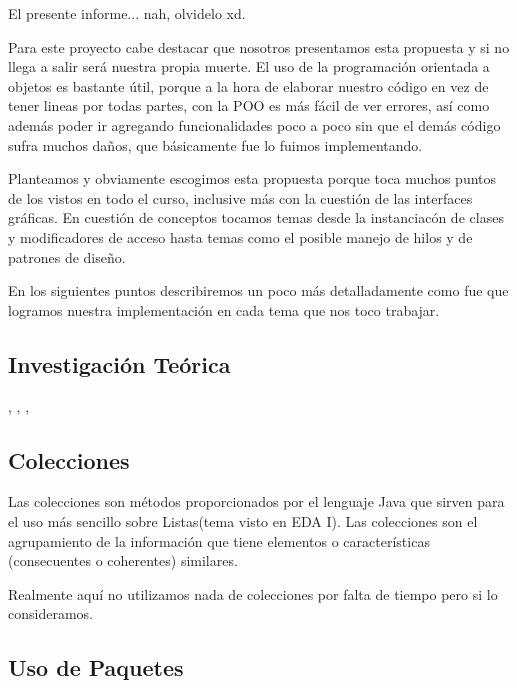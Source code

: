 \documentclass{article}
\begin{document}
El presente informe... nah, olvidelo xd.\newline

Para este proyecto cabe destacar que nosotros presentamos esta propuesta y si no llega a salir será nuestra propia muerte. El uso de la programación orientada a objetos es bastante útil, porque a la hora de elaborar nuestro código en vez de tener lineas por todas partes, con la POO es más fácil de ver errores, así como además poder ir agregando funcionalidades poco a poco sin que el demás código sufra muchos daños, que básicamente fue lo fuimos implementando.\newline

Planteamos y obviamente escogimos esta propuesta porque toca muchos puntos de los vistos en todo el curso, inclusive más con la cuestión de las interfaces gráficas. En cuestión de conceptos tocamos temas desde la instanciacón de clases y modificadores de acceso hasta temas como el posible manejo de hilos y de patrones de diseño.\newline

En los siguientes puntos describiremos un poco más detalladamente como fue que logramos nuestra implementación en cada tema que nos toco trabajar.\newline

\begin{center}
\section{Investigación Teórica}\cite{Mar}, \cite{dea}, \cite{kol}, \cite{ora}
\end{center}

\subsection{Colecciones}

Las colecciones son métodos proporcionados por el lenguaje Java que sirven para el uso más sencillo sobre Listas(tema visto en EDA I). Las colecciones son el agrupamiento de la información que tiene elementos o características  
(consecuentes o coherentes) similares.

Realmente aquí no utilizamos nada de colecciones por falta de tiempo pero si lo consideramos.

\subsection{Uso de Paquetes}
\end{document}

